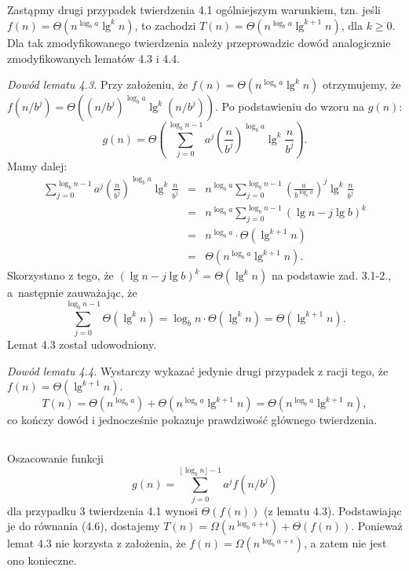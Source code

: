 \subsection{} %
Zastąpmy drugi przypadek twierdzenia 4.1 ogólniejszym warunkiem, tzn. jeśli $f(n)=\Theta(n^{\log_ba}\lg^kn)$, to zachodzi $T(n)=\Theta(n^{\log_ba}\lg^{k+1}n)$, dla $k\ge 0$. Dla tak zmodyfikowanego twierdzenia należy przeprowadzic dowód analogicznie zmodyfikowanych lematów 4.3 i 4.4.

\emph{Dowód lematu 4.3.} Przy założeniu, że $f(n)=\Theta(n^{\log_ba}\lg^kn)$ otrzymujemy, że $f(n/b^j)=\Theta((n/b^j)^{\log_ba}\lg^k(n/b^j))$. Po podstawieniu do wzoru na $g(n)$:
\[
	g(n) = \Theta\left(\sum_{j=0}^{\log_bn-1}a^j\left(\frac{n}{b^j}\right)^{\log_ba}\lg^k\frac{n}{b^j}\right).
\]
Mamy dalej:
\begin{eqnarray*}
	\sum_{j=0}^{\log_bn-1}a^j\left(\frac{n}{b^j}\right)^{\log_ba}\lg^k\frac{n}{b^j} &=& n^{\log_ba}\sum_{j=0}^{\log_bn-1}\left(\frac{a}{b^{\log_ba}}\right)^j\lg^k\frac{n}{b^j} \\
	&=& n^{\log_ba}\sum_{j=0}^{\log_bn-1}(\lg n-j\lg b)^k \\
	&=& n^{\log_ba}\cdot\Theta(\lg^{k+1}n) \\
	&=& \Theta(n^{\log_ba}\lg^{k+1}n).
\end{eqnarray*}
Skorzystano z tego, że $(\lg n-j\lg b)^k=\Theta(\lg^kn)$ na podstawie zad. 3.1-2., a~następnie zauważając, że
\[
	\sum_{j=0}^{\log_bn-1}\Theta(\lg^kn) = \log_bn\cdot\Theta(\lg^kn) = \Theta(\lg^{k+1}n).
\]
Lemat 4.3 został udowodniony.

\emph{Dowód lematu 4.4.} Wystarczy wykazać jedynie drugi przypadek z racji tego, że $f(n)=\Theta(\lg^{k+1}n)$.
\[
	T(n) = \Theta(n^{\log_ba})+\Theta(n^{\log_ba}\lg^{k+1}n) = \Theta(n^{\log_ba}\lg^{k+1}n),
\]
co kończy dowód i jednocześnie pokazuje prawdziwość głównego twierdzenia.

\subsection{} %
Oszacowanie funkcji
\[
	g(n) = \sum_{j=0}^{\lfloor\log_bn\rfloor-1}a^jf(n/b^j)
\]
dla przypadku 3 twierdzenia 4.1 wynosi $\Theta(f(n))$ (z lematu 4.3). Podstawiając je do równania (4.6), dostajemy $T(n)=\Omega(n^{\log_ba+\epsilon})+\Theta(f(n))$. 
Ponieważ lemat 4.3 nie korzysta z założenia, że $f(n)=\Omega(n^{\log_ba+\epsilon})$, a zatem nie jest ono konieczne.

\problems


